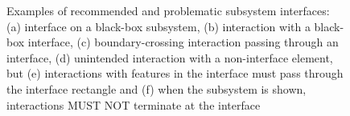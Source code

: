 \begin{enumerate}
	\begin{figure}[h!]
	\centering
	\hspace{1.0cm}
	\caption{Examples of recommended and problematic subsystem interfaces: (a) interface on a black-box subsystem, (b) interaction with a black-box interface, (c) boundary-crossing interaction passing through an interface, (d) unintended interaction with a non-interface element, but (e) interactions with features in the interface must pass through the interface rectangle and (f) when the subsystem is shown, interactions MUST NOT terminate at the interface}
	\label{exa:moduleD}
	\end{figure}

\end{enumerate}


